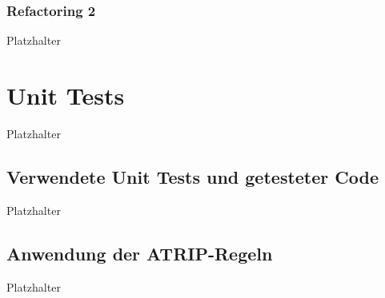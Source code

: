 \documentclass[12pt]{article}
\begin{document}
\subsubsection{Refactoring 2}
Platzhalter

\newpage

\section{Unit Tests}
Platzhalter

\subsection{Verwendete Unit Tests und getesteter Code}
Platzhalter

\subsection{Anwendung der ATRIP-Regeln}
Platzhalter


%
\end{document}

